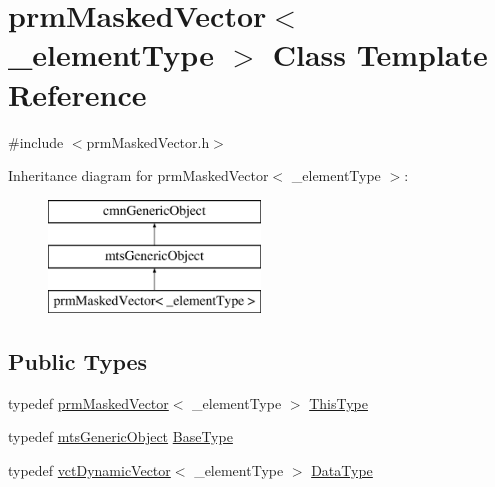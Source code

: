 \hypertarget{classprm_masked_vector}{}\section{prm\+Masked\+Vector$<$ \+\_\+element\+Type $>$ Class Template Reference}
\label{classprm_masked_vector}


{\ttfamily \#include $<$prm\+Masked\+Vector.\+h$>$}

Inheritance diagram for prm\+Masked\+Vector$<$ \+\_\+element\+Type $>$\+:\begin{figure}[H]
\begin{center}
\leavevmode
\includegraphics[height=3.000000cm]{db/d1b/classprm_masked_vector}
\end{center}
\end{figure}
\subsection*{Public Types}
\begin{DoxyCompactItemize}
\item 
typedef \hyperlink{classprm_masked_vector}{prm\+Masked\+Vector}$<$ \+\_\+element\+Type $>$ \hyperlink{classprm_masked_vector_aaa6c739a3050e8d46d9a7234ed4edc69}{This\+Type}
\item 
typedef \hyperlink{classmts_generic_object}{mts\+Generic\+Object} \hyperlink{classprm_masked_vector_ad206ecada790ba4b049868d83fd2abc2}{Base\+Type}
\item 
typedef \hyperlink{classvct_dynamic_vector}{vct\+Dynamic\+Vector}$<$ \+\_\+element\+Type $>$ \hyperlink{classprm_masked_vector_a7699da34296337db788196d01482defb}{Data\+Type}
\end{DoxyCompactItemize}

